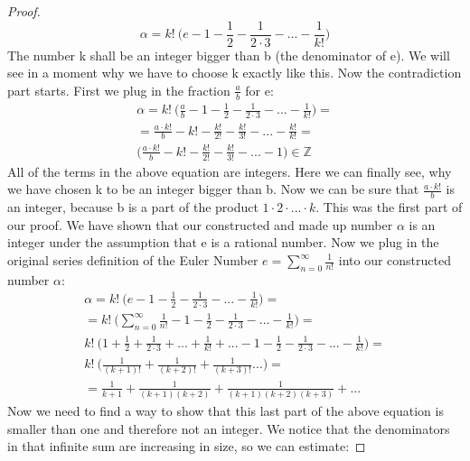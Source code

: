 \documentclass{article}
\theoremstyle{definition}
\begin{document}
\begin{proof}
\begin{equation}
    \alpha = k! \: \Big(e -  1- \frac{1}{2} -  \frac{1}{2\cdot 3} - ... -  \frac{1}{k!}\Big)
\end{equation}
The number k shall be an integer bigger than b (the denominator of e). We will see in a moment why we have to choose k exactly like this. Now the contradiction part starts. First we plug in the fraction $ \frac{a}{b}$ for e:
\begin{align}
\alpha = k! \: \Big(\frac{a}{b} -  1- \frac{1}{2} -  \frac{1}{2\cdot 3} - ... -  \frac{1}{k!}\Big) = \\
    = \frac{a\cdot k!}{b} - k! - \frac{k!}{2!} - \frac{k!}{3!} - ... - \frac{k!}{k!} = \\
    \Big( \frac{a\cdot k!}{b} - k! - \frac{k!}{2!} - \frac{k!}{3!} - ... - 1 \Big)\in \mathbb{Z} 
\end{align}
All of the terms in the above equation are integers. Here we can finally see, why we have chosen k to be an integer bigger than b. Now we can be sure that $\frac{a\cdot k!}{b}$ is an integer, because b is a part of the product $1\cdot 2 \cdot ... \cdot k$. This was the first part of our proof. We have shown that our constructed and made up number $\alpha$ is an integer under the assumption that e is a rational number. 
\newline
Now we plug in the original series definition of the Euler Number $e = \sum_{n=0}^{\infty} \frac{1}{n!}$ into our constructed number $\alpha$:
\begin{align}
     \alpha = k! \: \Big(e -  1- \frac{1}{2} -  \frac{1}{2\cdot 3} - ... -  \frac{1}{k!}\Big) = \\
    = k! \: \Big(\sum_{n=0}^{\infty} \frac{1}{n!} -  1- \frac{1}{2} -  \frac{1}{2\cdot 3} - ... -  \frac{1}{k!}\Big) = \\
    k! \: \Big(1+ \frac{1}{2} +  \frac{1}{2\cdot 3} + ... +  \frac{1}{k!} + ... -  1- \frac{1}{2} -  \frac{1}{2\cdot 3} - ... -  \frac{1}{k!}\Big) = \\
    k! \: \Big( \frac{1}{(k+1)!} + \frac{1}{(k+2)!} + \frac{1}{(k+3)!}...     \Big) = \\
    = \frac{1}{k+1} + \frac{1}{(k+1)(k+2)} + \frac{1}{(k+1)(k+2)(k+3)}+...
\end{align}
Now we need to find a way to show that this last part of the above equation is smaller than one and therefore not an integer. We notice that the denominators in that infinite sum are increasing in size, so we can estimate:


\end{proof}
\end{document}

